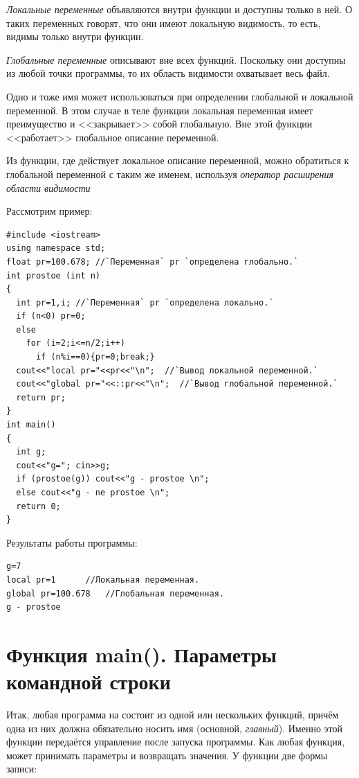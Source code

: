 \emph{Локальные переменные} объявляются внутри функции и доступны только в ней. О таких переменных говорят,
что они имеют локальную видимость, то есть, видимы только внутри функции. 

\emph{Глобальные переменные} описывают вне всех функций. Поскольку они доступны из любой точки программы,
то их область видимости охватывает весь файл.

Одно и тоже имя может использоваться при определении глобальной и локальной переменной. В этом случае в теле функции
локальная переменная имеет преимущество и <<закрывает>> собой глобальную. Вне этой функции <<работает>> глобальное описание
переменной.

Из функции, где действует локальное описание переменной, можно обратиться к глобальной переменной с таким же именем,
используя \emph{оператор расширения области видимости}


Рассмотрим пример:
\begin{lstlisting}
#include <iostream> 
using namespace std;
float pr=100.678; //`Переменная` pr `определена глобально.`
int prostoe (int n) 
{
  int pr=1,i; //`Переменная` pr `определена локально.`
  if (n<0) pr=0; 
  else 
    for (i=2;i<=n/2;i++) 
      if (n%i==0){pr=0;break;} 
  cout<<"local pr="<<pr<<"\n";  //`Вывод локальной переменной.`
  cout<<"global pr="<<::pr<<"\n";  //`Вывод глобальной переменной.`
  return pr; 
} 
int main()
{
  int g;
  cout<<"g="; cin>>g;
  if (prostoe(g)) cout<<"g - prostoe \n";
  else cout<<"g - ne prostoe \n";
  return 0;
}
\end{lstlisting}
Результаты работы программы:
\begin{verbatim}
g=7 
local pr=1 		//Локальная переменная.
global pr=100.678 	//Глобальная переменная.
g - prostoe 
\end{verbatim}

\section[Функция main(). Параметры командной строки]{Функция main(). Параметры командной строки}\label{ch04:9}
Итак, любая программа на  состоит из одной или нескольких функций, причём одна из них должна обязательно носить
имя  (основной, \emph{главный}). Именно этой функции передаётся управление после
запуска программы. Как любая функция,  может принимать параметры и возвращать значения. У
функции  две формы записи: 

